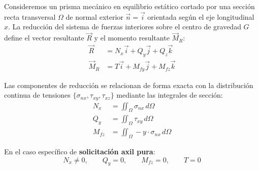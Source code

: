 Consideremos un prisma mecánico en equilibrio estático cortado por una sección recta transversal $\Omega$ de normal exterior $\vec{n} = \vec{i}$ orientada según el eje longitudinal $x$. La reducción del sistema de fuerzas interiores sobre el centro de gravedad $G$ define el vector resultante $\vec{R}$ y el momento resultante $\vec{M}_R$:
\begin{align}
    \vec{R}   & = N_x \vec{i} + Q_y \vec{j} + Q_z \vec{k}     \\
    \vec{M}_R & = T \vec{i} + M_{fy} \vec{j} + M_{fz} \vec{k}
\end{align}

Las componentes de reducción se relacionan de forma exacta con la distribución continua de tensiones $\{\sigma_{nx}, \tau_{xy}, \tau_{xz}\}$ mediante las integrales de sección:
\begin{align}
    N_x    & = \iint_{\Omega} \sigma_{nx} \, d\Omega           \\
    Q_y    & = \iint_{\Omega} \tau_{xy} \, d\Omega             \\
    M_{fz} & = \iint_{\Omega} - y \cdot \sigma_{nx} \, d\Omega
\end{align}

En el caso específico de \textbf{solicitación axil pura}:
\begin{equation}
    N_x \neq 0, \qquad Q_y = 0, \qquad M_{fz} = 0, \qquad T = 0
\end{equation}

